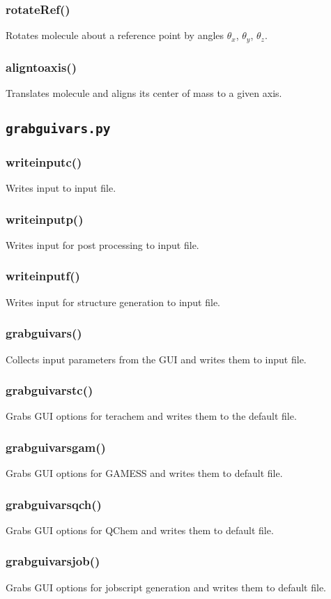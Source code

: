 \documentclass[a4paper,12pt]{assignment}
\begin{document}
\subsubsection{rotateRef()} 
Rotates molecule about a reference point by angles $\theta_x$, $\theta_y$, $\theta_z$.
\subsubsection{aligntoaxis()}
Translates molecule and aligns its center of mass to a given axis.

\subsection{\texttt{grabguivars.py}}
\subsubsection{writeinputc()}
Writes input to input file.
\subsubsection{writeinputp()}
Writes input for post processing to input file.
\subsubsection{writeinputf()}
Writes input for structure generation to input file.
\subsubsection{grabguivars()}
Collects input parameters from the GUI and writes them to input file.
\subsubsection{grabguivarstc()}
Grabs GUI options for terachem and writes them to the default file.
\subsubsection{grabguivarsgam()}
Grabs GUI options for GAMESS and writes them to default file.
\subsubsection{grabguivarsqch()}
Grabs GUI options for QChem and writes them to default file.
\subsubsection{grabguivarsjob()}
Grabs GUI options for jobscript generation and writes them to default file.
\end{document}
